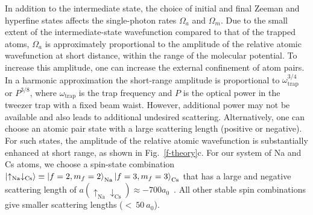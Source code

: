 \documentclass[aps,prl,twocolumn,10pt,superscriptaddress]{revtex4-1}
\newcommand{\Na}{\mathrm{Na}}
\newcommand{\Cs}{\mathrm{Cs}}
\begin{document}
In addition to the intermediate state,
the choice of initial and final Zeeman and hyperfine states affects the single-photon rates $\Omega_a$ and $\Omega_m$.
Due to the small extent of the intermediate-state wavefunction
compared to that of the trapped atoms,
$\Omega_a$ is approximately proportional to
the amplitude of the relative atomic wavefunction at short distance,
within the range of the molecular potential.
To increase this amplitude, one can increase the external confinement of atom pairs.
In a harmonic approximation
the short-range amplitude is proportional to $ \omega_{\text{trap}}^{3/4} $ or $P^{3/8}$,
where $ \omega_{\text{trap}} $ is the trap frequency and $P$ is the optical power in the tweezer trap \cite{Mies2000} with a fixed beam waist. However, additional power may not be available and also leads to additional undesired scattering.
Alternatively, one can choose an atomic pair state with a large scattering length
(positive or negative).
For such states, the amplitude of the relative atomic wavefunction is substantially enhanced
at short range, as shown in Fig.~\ref{f-theory}c.
For our system of Na and Cs atoms,
we choose a spin-state combination $\ket{\uparrow_{\Na} \downarrow_{\Cs}}\equiv \ket{f=2,m_f=2}_{\Na}\ket{f=3,m_f=3}_{\Cs}$ that has a large and negative scattering length of
$a(\uparrow_{\Na} \downarrow_{\Cs}) \approx -700a_0$~\cite{Hood2019}.
All other stable spin combinations give smaller scattering lengths ($<~50~a_0$).
\end{document}
